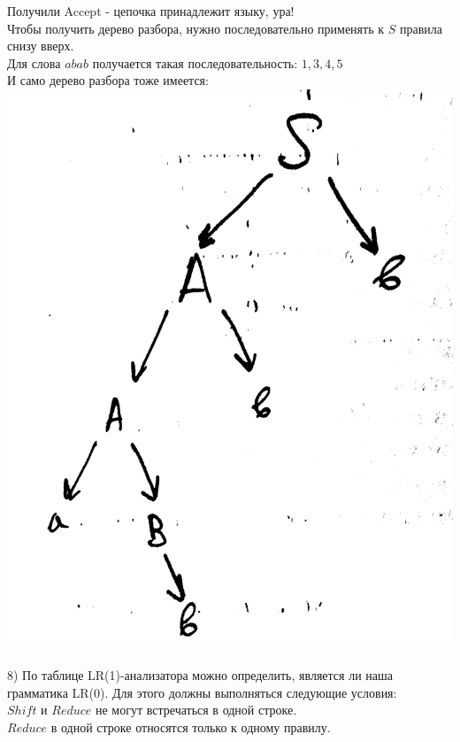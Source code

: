 \documentclass[14pt]{extreport}
\begin{document}
	Получили Accept - цепочка принадлежит языку, ура!\\
	\newpage
	Чтобы получить дерево разбора, нужно последовательно применять к $S$ правила снизу вверх.\\
	Для слова $abab$ получается такая последовательность: $1, 3, 4, 5$\\
	И само дерево разбора тоже имеется:\\
	\includegraphics[scale=0.1]{data/pic8_2.png}\\\\
	
	8) По таблице LR(1)-анализатора можно определить, является ли наша грамматика LR(0). Для
	этого должны выполняться следующие условия:\\
	\hspace*{30pt} $Shift$ и $Reduce$ не могут встречаться в одной строке.\\
	\hspace*{30pt} $Reduce$ в одной строке относятся только к одному правилу.\\\\
\end{document}
